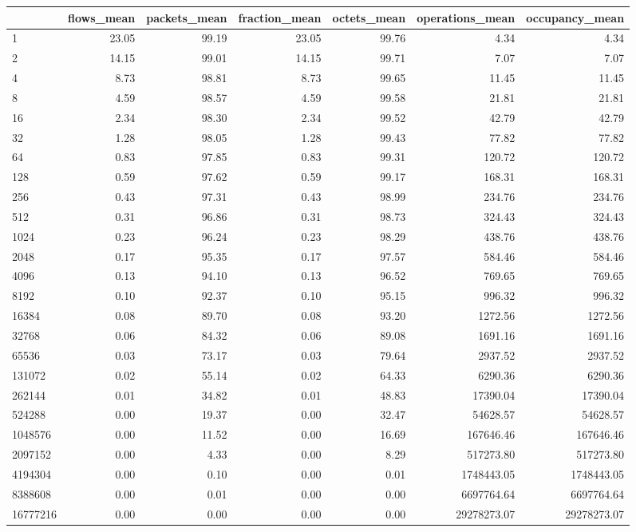 \begin{tabular}{lrrrrrr}
\toprule
 & flows_mean & packets_mean & fraction_mean & octets_mean & operations_mean & occupancy_mean \\
\midrule
1 & 23.05 & 99.19 & 23.05 & 99.76 & 4.34 & 4.34 \\
2 & 14.15 & 99.01 & 14.15 & 99.71 & 7.07 & 7.07 \\
4 & 8.73 & 98.81 & 8.73 & 99.65 & 11.45 & 11.45 \\
8 & 4.59 & 98.57 & 4.59 & 99.58 & 21.81 & 21.81 \\
16 & 2.34 & 98.30 & 2.34 & 99.52 & 42.79 & 42.79 \\
32 & 1.28 & 98.05 & 1.28 & 99.43 & 77.82 & 77.82 \\
64 & 0.83 & 97.85 & 0.83 & 99.31 & 120.72 & 120.72 \\
128 & 0.59 & 97.62 & 0.59 & 99.17 & 168.31 & 168.31 \\
256 & 0.43 & 97.31 & 0.43 & 98.99 & 234.76 & 234.76 \\
512 & 0.31 & 96.86 & 0.31 & 98.73 & 324.43 & 324.43 \\
1024 & 0.23 & 96.24 & 0.23 & 98.29 & 438.76 & 438.76 \\
2048 & 0.17 & 95.35 & 0.17 & 97.57 & 584.46 & 584.46 \\
4096 & 0.13 & 94.10 & 0.13 & 96.52 & 769.65 & 769.65 \\
8192 & 0.10 & 92.37 & 0.10 & 95.15 & 996.32 & 996.32 \\
16384 & 0.08 & 89.70 & 0.08 & 93.20 & 1272.56 & 1272.56 \\
32768 & 0.06 & 84.32 & 0.06 & 89.08 & 1691.16 & 1691.16 \\
65536 & 0.03 & 73.17 & 0.03 & 79.64 & 2937.52 & 2937.52 \\
131072 & 0.02 & 55.14 & 0.02 & 64.33 & 6290.36 & 6290.36 \\
262144 & 0.01 & 34.82 & 0.01 & 48.83 & 17390.04 & 17390.04 \\
524288 & 0.00 & 19.37 & 0.00 & 32.47 & 54628.57 & 54628.57 \\
1048576 & 0.00 & 11.52 & 0.00 & 16.69 & 167646.46 & 167646.46 \\
2097152 & 0.00 & 4.33 & 0.00 & 8.29 & 517273.80 & 517273.80 \\
4194304 & 0.00 & 0.10 & 0.00 & 0.01 & 1748443.05 & 1748443.05 \\
8388608 & 0.00 & 0.01 & 0.00 & 0.00 & 6697764.64 & 6697764.64 \\
16777216 & 0.00 & 0.00 & 0.00 & 0.00 & 29278273.07 & 29278273.07 \\
\bottomrule
\end{tabular}
